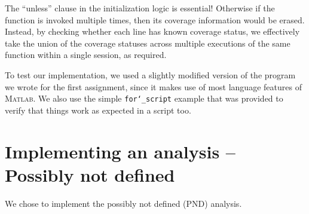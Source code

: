\documentclass[letterpaper,11pt]{article}
\newcommand{\matlab}{\textsc{Matlab}}
\begin{document}
The ``unless'' clause in the initialization logic is essential! Otherwise if
the function is invoked multiple times, then its coverage information would be
erased. Instead, by checking whether each line has known coverage status, we
effectively take the union of the coverage statuses across multiple executions
of the same function within a single session, as required.

To test our implementation, we used a slightly modified version of the program
we wrote for the first assignment, since it makes use of most language features
of \matlab{}. We also use the simple \texttt{for\char`_script} example that was
provided to verify that things work as expected in a script too.

\section{Implementing an analysis -- Possibly not defined}

We chose to implement the possibly not defined (PND) analysis.
\end{document}

